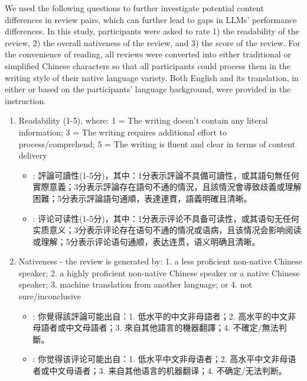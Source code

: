 We used the following questions to further investigate potential content differences in review pairs, which can further lead to gaps in LLMs' performance differences. In this study, participants were asked to rate 1) the readability of the review, 2) the overall nativeness of the review, and 3) the score of the review. For the convenience of reading, all reviews were converted into either traditional or simplified Chinese characters so that all participants could process them in the writing style of their native language variety. Both English and its translation, in either \cnChinese or \twChinese based on the participants' language background, were provided in the instruction.
\begin{enumerate}
    \item Readability (1-5), where: 1 = The writing doesn't contain any literal information; 3 = The writing requires additional effort to process/comprehend; 5 = The writing is fluent and clear in terms of content delivery
    \begin{itemize}[leftmargin=*]
        \item \begin{CJK*}{UTF8}{bsmi}\twChinese: 評論可讀性(1-5分)，其中：1分表示評論不具備可讀性，或其語句無任何實際意義；3分表示評論存在語句不通的情況，且該情況會導致歧義或理解困難；5分表示評論語句通順，表達連貫，語義明確且清晰。
        \end{CJK*}
        \item \begin{CJK*}{UTF8}{gbsn}\cnChinese: 评论可读性(1-5分)，其中：1分表示评论不具备可读性，或其语句无任何实质意义；3分表示评论存在语句不通的情况或语病，且该情况会影响阅读或理解；5分表示评论语句通顺，表达连贯，语义明确且清晰。
        \end{CJK*}
    \end{itemize}
    
    \item Nativeness - the review is generated by: 1. a less proficient non-native Chinese speaker; 2. a highly proficient non-native Chinese speaker or a native Chinese speaker; 3. machine translation from another language; or 4. not sure/inconclusive
    \begin{itemize}[leftmargin=*]
        \item \begin{CJK*}{UTF8}{bsmi} \twChinese: 你覺得該評論可能出自：1. 低水平的中文非母語者；2. 高水平的中文非母語者或中文母語者；3. 來自其他語言的機器翻譯；4. 不確定/無法判斷。
        \end{CJK*}
        \item \begin{CJK*}{UTF8}{gbsn} \cnChinese: 你觉得该评论可能出自：1. 低水平中文非母语者；2. 高水平中文非母语者或中文母语者；3. 来自其他语言的机器翻译；4. 不确定/无法判断。
        \end{CJK*}
    \end{itemize}


\end{enumerate}
